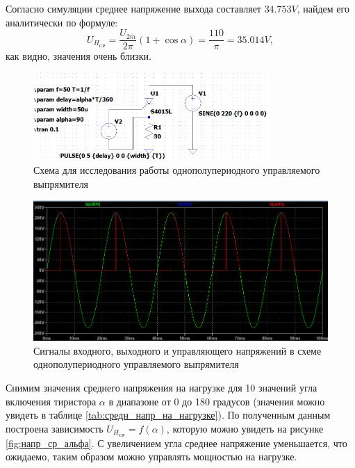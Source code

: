 Согласно симуляции среднее напряжение выхода составляет $34.753 V$, найдем его
аналитически по формуле:
\begin{equation*}
    U_{H_{\text{СР}}}=\frac{U_{2m}}{2\pi}(1+\cos\alpha)=\frac{110}{\pi}=35.014 V,
\end{equation*}
как видно, значения очень близки.

\begin{figure}[H]
    \centering
    \includegraphics[width=0.8\textwidth]{figs/иссл_упр_выпр_схема.png}
    \caption{Схема для исследования работы однополупериодного
    управляемого выпрямителя}
    \label{fig:иссл_упр_выпр_схема}
\end{figure}

\begin{figure}[H]
    \centering
    \includegraphics[width=1\textwidth]{figs/иссл_упр_выпр.png}
    \caption{Сигналы входного, выходного и управляющего напряжений в схеме 
    однополупериодного управляемого выпрямителя}
    \label{fig:иссл_упр_выпр}
\end{figure}

Снимим значения среднего напряжения на нагрузке для 10
значений угла включения тиристора $\alpha$ в диапазоне от 0
до 180 градусов (значения можно увидеть в таблице \ref{tab:средн_напр_на_нагрузке}). 
По полученным данным построена зависимость $U_{H_{\text{СР}}}=f(\alpha)$,
которую можно увидеть на рисунке \ref{fig:напр_ср_альфа}. С увеличением угла среднее
напряжение уменьшается, что ожидаемо, таким образом можно управлять мощностью на нагрузке.


